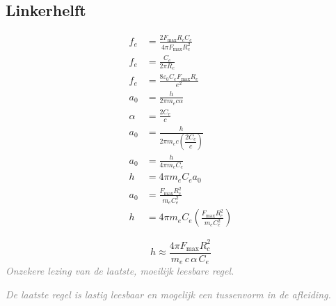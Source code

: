 \documentclass[11pt,a4paper]{article}
\newcommand{\uncertain}[1]{\textit{\textcolor{gray}{#1}}}
\begin{document}
\begin{minipage}[t]{0.48\textwidth}
\subsection*{Linkerhelft}
\begin{align*}
f_e &= \frac{2 F_{\max} R_c C_e}{4\pi F_{\max} R_c^2}
\\
f_e &= \frac{C_e}{2\pi R_c}
\\
f_e &= \frac{8 \varepsilon_0 C_e F_{\max} R_c}{e^2}
\\
a_0 &= \frac{h}{2\pi m_e c \alpha}
\\
\alpha &= \frac{2 C_e}{c}
\\
a_0 &= \frac{h}{2\pi m_e c \left(\dfrac{2C_e}{c}\right)}
\\
a_0 &= \frac{h}{4\pi m_e C_e}
\\
h &= 4\pi m_e C_e a_0
\\
a_0 &= \frac{F_{\max} R_c^2}{m_e C_e^2}
\\
h &= 4\pi m_e C_e
     \left(\frac{F_{\max} R_c^2}{m_e C_e^2}\right)
\end{align*}

\[
h \approx \frac{4\pi F_{\max} R_c^2}{m_e\, c\, \alpha\, C_e}
\]
\uncertain{Onzekere lezing van de laatste, moeilijk leesbare regel.}

\uncertain{De laatste regel is lastig leesbaar en mogelijk een tussenvorm in de afleiding.}
\end{minipage}
\hfill
\end{document}
